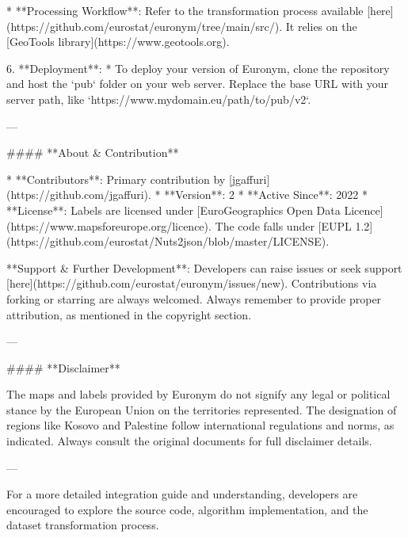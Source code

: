     * **Processing Workflow**: Refer to the transformation process available [here](https://github.com/eurostat/euronym/tree/main/src/). It relies on the [GeoTools library](https://www.geotools.org).

6. **Deployment**:
    * To deploy your version of Euronym, clone the repository and host the `pub` folder on your web server. Replace the base URL with your server path, like `https://www.mydomain.eu/path/to/pub/v2`.

---

#### **About & Contribution**

* **Contributors**: Primary contribution by [jgaffuri](https://github.com/jgaffuri).
* **Version**: 2
* **Active Since**: 2022
* **License**: Labels are licensed under [EuroGeographics Open Data Licence](https://www.mapsforeurope.org/licence). The code falls under [EUPL 1.2](https://github.com/eurostat/Nuts2json/blob/master/LICENSE).

**Support & Further Development**: 
Developers can raise issues or seek support [here](https://github.com/eurostat/euronym/issues/new). Contributions via forking or starring are always welcomed. Always remember to provide proper attribution, as mentioned in the copyright section.

---

#### **Disclaimer**

The maps and labels provided by Euronym do not signify any legal or political stance by the European Union on the territories represented. The designation of regions like Kosovo and Palestine follow international regulations and norms, as indicated. Always consult the original documents for full disclaimer details.

---

For a more detailed integration guide and understanding, developers are encouraged to explore the source code, algorithm implementation, and the dataset transformation process.